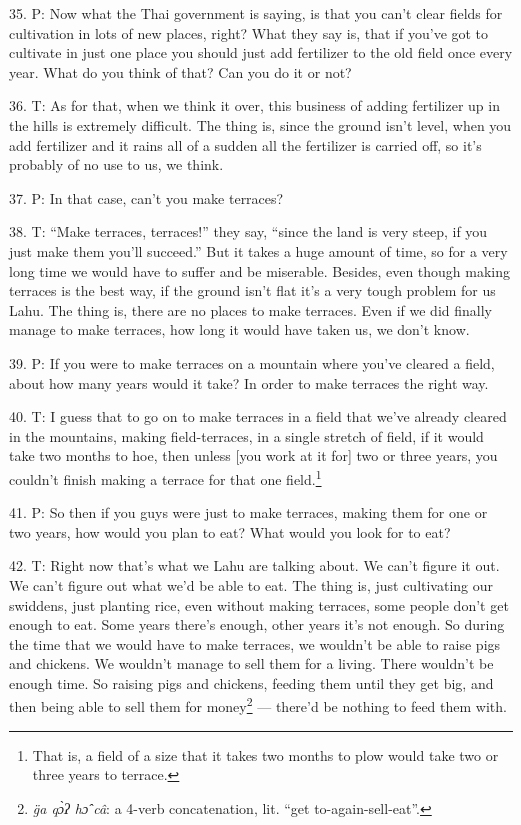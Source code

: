 35. P: Now what the Thai government is saying, is that you can't clear fields for
cultivation in lots of new places, right? What they say is, that if you've got
to cultivate in just one place you should just add fertilizer to the old field
once every year. What do you think of that? Can you do it or not?

36. T: As for that, when we think it over, this business of adding fertilizer up
in the hills is extremely difficult. The thing is, since the ground isn't level,
when you add fertilizer and it rains all of a sudden all the fertilizer is carried
off, so it's probably of no use to us, we think.

37. P: In that case, can't you make terraces?

38. T: ``Make terraces, terraces!'' they say, ``since the land is very steep, if
you just make them you'll succeed.'' But it takes a huge amount of time, so for
a very long time we would have to suffer and be miserable. Besides, even though
making terraces is the best way, if the ground isn't flat it's a very tough problem
for us Lahu. The thing is, there are no places to make terraces. Even if we did
finally manage to make terraces, how long it would have taken us, we don't know.

39. P: If you were to make terraces on a mountain where you've cleared a field,
about how many years would it take? In order to make terraces the right way.

40. T: I guess that to go on to make terraces in a field that we've already cleared
in the mountains, making field-terraces, in a single stretch of field, if it would
take two months to hoe, then unless [you work at it for] two or three years, you
couldn't finish making a terrace for that one field.\footnote{That is, a field of a size that it takes two months to plow would take two or three years to terrace.}

41. P: So then if you guys were just to make terraces, making them for one or two
years, how would you plan to eat? What would you look for to eat?

42. T: Right now that's what we Lahu are talking about. We can't figure it out.
We can't figure out what we'd be able to eat. The thing is, just cultivating our
swiddens, just planting rice, even without making terraces, some people don't get
enough to eat. Some years there's enough, other years it's not enough. So during
the time that we would have to make terraces, we wouldn't be able to raise pigs
and chickens. We wouldn't manage to sell them for a living. There wouldn't be enough
time. So raising pigs and chickens, feeding them until they get big, and then being
able to sell them for money\footnote{\textit{g̈a qɔ̀ʔ hɔ̂ câ}: a 4-verb concatenation, lit. ``get to-again-sell-eat''.} --- there'd be nothing to feed them with.

